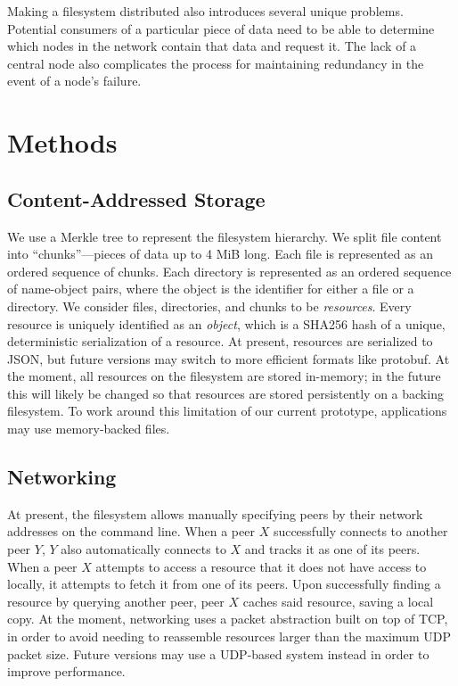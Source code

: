 \documentclass[twocolumn]{article}
\begin{document}
Making a filesystem distributed also introduces several unique problems.
Potential consumers of a particular piece of data need to be able to determine which nodes in the network contain that data and request it.
The lack of a central node also complicates the process for maintaining redundancy in the event of a node's failure.

\section{Methods}

\subsection{Content-Addressed Storage}

We use a Merkle tree to represent the filesystem hierarchy.
We split file content into ``chunks''—pieces of data up to 4 MiB long.
Each file is represented as an ordered sequence of chunks.
Each directory is represented as an ordered sequence of name-object pairs, where the object is the identifier for either a file or a directory.
We consider files, directories, and chunks to be \textit{resources}.
Every resource is uniquely identified as an \textit{object}, which is a SHA256 hash of a unique, deterministic serialization of a resource.
At present, resources are serialized to JSON, but future versions may switch to more efficient formats like protobuf.
At the moment, all resources on the filesystem are stored in-memory; in the future this will likely be changed so that resources are stored persistently on a backing filesystem.
To work around this limitation of our current prototype, applications may use memory-backed files.

\subsection{Networking}

At present, the filesystem allows manually specifying peers by their network addresses on the command line.
When a peer $X$ successfully connects to another peer $Y$, $Y$ also automatically connects to $X$ and tracks it as one of its peers.
When a peer $X$ attempts to access a resource that it does not have access to locally, it attempts to fetch it from one of its peers.
Upon successfully finding a resource by querying another peer, peer $X$ caches said resource, saving a local copy.
At the moment, networking uses a packet abstraction built on top of TCP, in order to avoid needing to reassemble resources larger than the maximum UDP packet size.
Future versions may use a UDP-based system instead in order to improve performance. %
\end{document}
